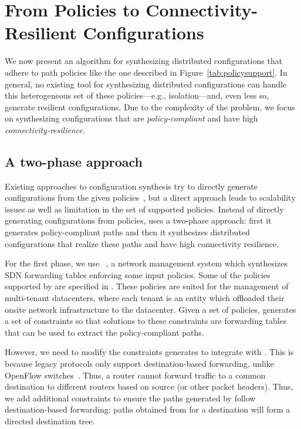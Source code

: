 \section{From Policies to Connectivity- Resilient Configurations}
\label{sec:config-synthesis}

We now present an algorithm
for synthesizing distributed configurations
that adhere to path policies like the one described 
in Figure~\ref{tab:policysupport}.
In general, no existing tool for synthesizing 
distributed configurations
can handle this heterogeneous set of 
these policies---e.g., isolation---and, even less so,
generate resilient configurations.
Due to the complexity of the problem, we focus on 
synthesizing  configurations that 
are \emph{policy-compliant} and have high \emph{connectivity-resilience}.



\subsection{A two-phase approach}
Existing approaches to configuration synthesis
try to directly generate configurations from the given policies~\cite{synet},
but a direct approach leads to scalability issues as well as limitation
in the set of supported policies.
Instead of directly generating configurations from policies, 
\name uses a two-phase approach:
first it generates policy-compliant paths
and then it synthesizes distributed configurations that realize these paths
and have high connectivity resilience.

For the first phase, we use \genesis~\cite{genesis}, 
a network management system which synthesizes 
SDN forwarding tables enforcing some input policies. 
Some of the policies supported by \genesis are specified in 
. These policies are suited for the 
management of multi-tenant datacenters, where each tenant is 
an entity which offloaded their 
onsite network infrastructure to the datacenter. 
Given a set of policies, \genesis generates a set of constraints 
so that solutions to these constraints are forwarding
tables that can be used to extract the 
policy-compliant paths. 

However, we need to modify the constraints \genesis generates
to integrate with \name. This is because legacy protocols only
support destination-based forwarding, unlike OpenFlow switches~\cite{openflow}. 
Thus, a router cannot forward traffic to a common
destination to different routers based on source (or other 
packet headers). Thus, we add additional constraints to ensure
the paths generated by \genesis follow destination-based 
forwarding: paths obtained from 
\genesis for a destination will form a directed destination tree. 

